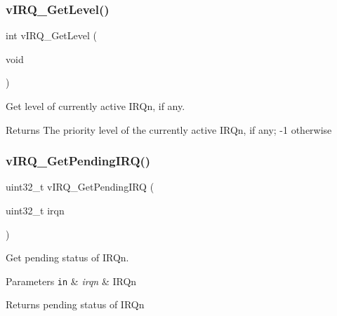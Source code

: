 \subsubsection{\texorpdfstring{v\+I\+R\+Q\+\_\+\+Get\+Level()}{vIRQ\_GetLevel()}}
{\footnotesize\ttfamily int v\+I\+R\+Q\+\_\+\+Get\+Level (\begin{DoxyParamCaption}\item[{void}]{ }\end{DoxyParamCaption})}



Get level of currently active I\+R\+Qn, if any. 

\begin{DoxyReturn}{Returns}
The priority level of the currently active I\+R\+Qn, if any; -\/1 otherwise 
\end{DoxyReturn}
\hypertarget{group__hypervisor_gad450b31ead2ec4f7bb2dbe07ebcfd8e7}{}\label{group__hypervisor_gad450b31ead2ec4f7bb2dbe07ebcfd8e7} 
\subsubsection{\texorpdfstring{v\+I\+R\+Q\+\_\+\+Get\+Pending\+I\+R\+Q()}{vIRQ\_GetPendingIRQ()}}
{\footnotesize\ttfamily uint32\+\_\+t v\+I\+R\+Q\+\_\+\+Get\+Pending\+I\+RQ (\begin{DoxyParamCaption}\item[{uint32\+\_\+t}]{irqn }\end{DoxyParamCaption})}



Get pending status of I\+R\+Qn. 


\begin{DoxyParams}[1]{Parameters}
\mbox{\tt in}  & {\em irqn} & I\+R\+Qn\\
\hline
\end{DoxyParams}
\begin{DoxyReturn}{Returns}
pending status of I\+R\+Qn 
\end{DoxyReturn}
\hypertarget{group__hypervisor_ga3da0be917ac42157f0d33e3e1412379b}{}\label{group__hypervisor_ga3da0be917ac42157f0d33e3e1412379b} 
